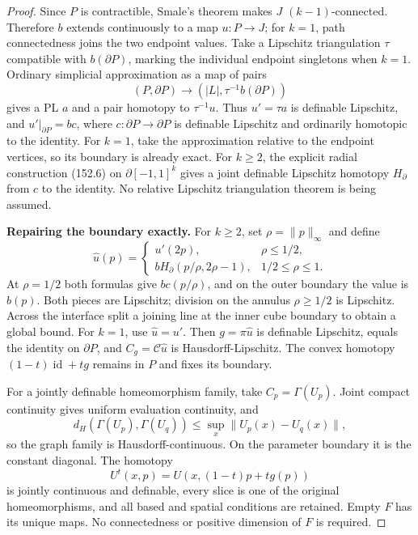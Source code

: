\begin{proof}
Since \(P\) is contractible, Smale's theorem makes \(J\)
\((k-1)\)-connected. Therefore \(b\) extends continuously to a
map \(u:P\to J\); for \(k=1\), path connectedness joins the two
endpoint values.
Take a Lipschitz triangulation \(\tau\) compatible with
\(b(\partial P)\), marking the individual endpoint singletons
when \(k=1\).
Ordinary simplicial approximation as a map of pairs
\[
 (P,\partial P)\longrightarrow
 (|L|,\tau^{-1}b(\partial P))
\]
gives a PL \(a\) and a pair homotopy to \(\tau^{-1}u\).
Thus \(u'=\tau a\) is definable Lipschitz, and
\(u'|_{\partial P}=bc\), where
\(c:\partial P\to\partial P\) is definable Lipschitz and ordinarily
homotopic to the identity.
For \(k=1\), take the approximation relative to the endpoint
vertices, so its boundary is already exact.
For \(k\ge2\), the explicit radial construction (152.6) on
\(\partial[-1,1]^k\) gives a joint definable Lipschitz homotopy
\(H_\partial\) from \(c\) to the identity.
No relative Lipschitz triangulation theorem is being assumed.

\textbf{Repairing the boundary exactly.}
For \(k\ge2\), set \(\rho=\|p\|_\infty\) and define
\[
 \widehat u(p)=
 \begin{cases}
 u'(2p),&\rho\le1/2,\\
 bH_\partial(p/\rho,2\rho-1),&1/2\le\rho\le1.
 \end{cases}
 \tag{152.8}
\]
At \(\rho=1/2\) both formulas give \(bc(p/\rho)\), and on the
outer boundary the value is \(b(p)\).
Both pieces are Lipschitz; division on the annulus
\(\rho\ge1/2\) is Lipschitz. Across the interface split a joining
line at the inner cube boundary to obtain a global bound.
For \(k=1\), use \(\widehat u=u'\).
Then \(g=\pi\widehat u\) is definable Lipschitz,
equals the identity on \(\partial P\), and
\(C_g=\mathcal C\widehat u\) is Hausdorff-Lipschitz.
The convex homotopy
\((1-t)\operatorname{id}+tg\) remains in \(P\) and fixes its
boundary.

For a jointly definable homeomorphism family, take
\(C_p=\Gamma(U_p)\). Joint compact continuity gives uniform
evaluation continuity, and
\[
 d_H(\Gamma(U_p),\Gamma(U_q))
       \le\sup_x\|U_p(x)-U_q(x)\|,
\]
so the graph family is Hausdorff-continuous.
On the parameter boundary it is the constant diagonal.
The homotopy
\[
 U^t(x,p)=U(x,(1-t)p+tg(p))
\]
is jointly continuous and definable, every slice is one of the
original homeomorphisms, and all based and spatial conditions
are retained. Empty \(F\) has its unique maps.
No connectedness or positive dimension of \(F\) is required.
\end{proof}

